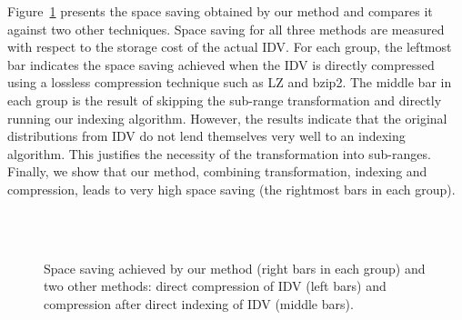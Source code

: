 Figure~\ref{fig:spacesaving} presents the space saving obtained by our method and compares it against two other techniques. Space saving for all three methods are measured with respect to the storage cost of the actual IDV. For each group, the leftmost bar indicates the space saving achieved when the IDV is directly compressed using a lossless compression technique such as LZ and bzip2. The middle bar in each group is the result of skipping the sub-range transformation and directly running our indexing algorithm. However, the results indicate that the original distributions from IDV do not lend themselves very well to an indexing algorithm. This justifies the necessity of the transformation into sub-ranges. Finally, we show that our method, combining transformation, indexing and compression, leads to very high space saving (the rightmost bars in each group). 
\begin{figure}[tb]
\centering
	\\
	~
	\caption{Space saving achieved by our method (right bars in each group) and two other methods: direct compression of IDV (left bars) and compression after direct indexing of IDV (middle bars).}	
	\label{fig:spacesaving}
\end{figure}
